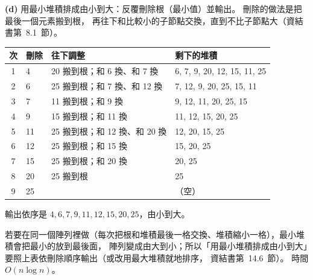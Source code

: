 \begin{pastsoln}
\textbf{(d)} 用最小堆積排成由小到大：反覆刪除根（最小值）並輸出。 刪除的做法是把最後一個元素搬到根，
再往下和比較小的子節點交換，直到不比子節點大（資結書第~8.1~節）。
\begin{center}
\small
\begin{tabular}{clll}
\toprule
次 & 刪除 & 往下調整 & 剩下的堆積 \\
\midrule
1 & 4 & 20 搬到根；和 6 換、和 7 換 & 6, 7, 9, 20, 12, 15, 11, 25 \\
2 & 6 & 25 搬到根；和 7 換、和 12 換 & 7, 12, 9, 20, 25, 15, 11 \\
3 & 7 & 11 搬到根；和 9 換 & 9, 12, 11, 20, 25, 15 \\
4 & 9 & 15 搬到根；和 11 換 & 11, 12, 15, 20, 25 \\
5 & 11 & 25 搬到根；和 12 換、和 20 換 & 12, 20, 15, 25 \\
6 & 12 & 25 搬到根；和 15 換 & 15, 20, 25 \\
7 & 15 & 25 搬到根；和 20 換 & 20, 25 \\
8 & 20 & 25 搬到根 & 25 \\
9 & 25 & & （空） \\
\bottomrule
\end{tabular}
\end{center}
輸出依序是 $4, 6, 7, 9, 11, 12, 15, 20, 25$，由小到大。

若要在同一個陣列裡做（每次把根和堆積最後一格交換、堆積縮小一格），最小堆積會把最小的放到最後面，
陣列變成由大到小；所以「用最小堆積排成由小到大」要照上表依刪除順序輸出（或改用最大堆積就地排序，
資結書第~14.6~節）。 時間 $O(n \log n)$。
\end{pastsoln}
